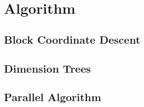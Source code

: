 \section{Algorithm} \label{sec:algorithm}

\subsection{Block Coordinate Descent}

\subsection{Dimension Trees}

\subsection{Parallel Algorithm}

